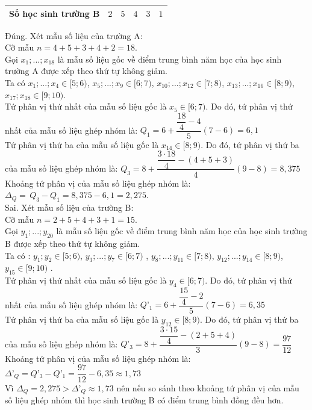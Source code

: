\begin{ex}
{\begin{itemchoice}
\begin{tabular}{|c|c|c|c|c|c|}
				\hline
				Số học sinh trường B & $2$  & $5$ & $4$ & $3$  & $1$  \\
				\hline
			\end{tabular}
			\itemch Đúng. 
			Xét mẫu số liệu của trường A:\\
			Cỡ mẫu $n = 4 + 5 + 3 + 4 + 2 = 18$.\\
			Gọi  ${x_1};...;{x_{18}}$ là mẫu số liệu gốc về điểm trung bình năm học của học sinh trường A được xếp theo thứ tự không giảm.\\
			Ta có ${x_1};...;{x_4} \in[5; 6) $, 
			${x_5};...;{x_9} \in [6; 7)$,  ${x_{10}};...;{x_{12}} \in [7; 8)$,  ${x_{13}};...;{x_{16}} \in [8; 9)$, ${x_{17}};{x_{18}} \in [9; 10)$.\\
			Tứ phân vị thứ nhất của mẫu số liệu gốc là ${x_5} \in [6; 7)$. Do đó, tứ phân vị thứ nhất của mẫu số liệu ghép nhóm là:  ${Q_1} = 6 + \dfrac{{\dfrac{18}{4} - 4}}{5} (7 - 6) = 6{,}1$\\
			Tứ phân vị thứ ba của mẫu số liệu gốc là ${x_{14}} \in [8; 9)$. Do đó, tứ phân vị thứ ba của mẫu số liệu ghép nhóm là:  ${Q_3} = 8 + \dfrac{\dfrac{3\cdot18}{4} - ( 4 + 5 + 3)}{4}(9-8) = 8,375$\\
			Khoảng tứ phân vị của mẫu số liệu ghép nhóm là: ${\Delta _Q} = \,{Q_3} - {Q_1} = 8{,}375 - 6{,}1 = 2{,}275$. \\
			
			\itemch Sai. Xét mẫu số liệu của trường B:\\
			Cỡ mẫu $n = 2 + 5 + 4 + 3 + 1 = 15$.\\
			Gọi ${y_1};...;{y_{20}}$ là mẫu số liệu gốc về điểm trung bình năm học của học sinh trường B được xếp theo thứ tự không giảm.\\
			Ta có : ${y_1};{y_2} \in [5; 6)$, ${y_3};...;{y_7} \in [6; 7)$ , ${y_8};...;{y_{11}} \in [7; 8)$, ${y_{12}};...;{y_{14}} \in [8; 9)$, ${y_{15}} \in [9; 10) $ .\\
			Tứ phân vị thứ nhất của mẫu số liệu gốc là ${y_4} \in [6; 7)$. Do đó, tứ phân vị thứ nhất của mẫu số liệu ghép nhóm là: $Q’_{1} = 6 + \dfrac{\dfrac{15}{4} - 2}{5} (7-6) = 6{,}35$\\
			Tứ phân vị thứ ba của mẫu số liệu gốc là ${y_{12}} \in [8; 9)$. Do đó, tứ phân vị thứ ba của mẫu số liệu ghép nhóm là:  $Q’_{3} = 8 + \dfrac{{\dfrac{3\cdot15}{4} - ( 2 + 5 + 4)}}{3} (9 - 8) = \dfrac{97}{12}$\\
			Khoảng tứ phân vị của mẫu số liệu ghép nhóm là: $\Delta’_{Q}= {Q’_3} - {Q’_1} = \dfrac{97}{12} - 6{,}35 \approx 1{,}73$\\
			Vì $ \Delta_{Q}=2{,}275>\Delta’_{Q}\approx 1{,}73$ nên nếu so sánh theo khoảng tứ phân vị của mẫu số liệu ghép nhóm thì học sinh trường B có điểm trung bình đồng đều hơn.
			

\end{itemchoice}}
\end{ex}
